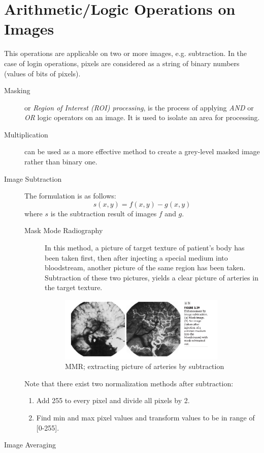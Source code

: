\documentclass{article}
\begin{document}
\section{Arithmetic/Logic Operations on Images}
This operations are applicable on two or more images, e.g. subtraction. In the case of login operations, pixels are considered as a string of binary numbers (values of bits of pixels).\\
\begin{description}
\item[Masking] or \textit{Region of Interest (ROI) processing}, is the process of applying \textit{AND} or \textit{OR} logic operators on an image. It is used to isolate an area for processing.\\
\item[Multiplication] can be used as a more effective method to create a grey-level masked image rather than binary one.
\item[Image Subtraction] 
	The formulation is as follows:
	\begin{equation}
		s(x, y) = f(x, y) - g(x, y)
	\end{equation}
	where $s$ is the subtraction result of images $f$ and $g$.
\begin{description}
	\item[Mask Mode Radiography] In this method, a picture of target texture of patient's body has been taken first, then after injecting a special medium into bloodstream, another picture of the same region has been taken. Subtraction of these two pictures, yields a clear picture of arteries in the target texture. 
	\begin{figure}[h]
	\centering
	\includegraphics[width=300px]{./Imgs/mmr.png}
	\caption{MMR; extracting picture of arteries by subtraction}
	\end{figure}
\end{description} 
Note that there exist two normalization methods after subtraction:\\
\begin{enumerate}
	\item Add 255 to every pixel and divide all pixels by 2.
	\item Find min and max pixel values and transform values to be in range of [0-255].
\end{enumerate}

\item[Image Averaging]

\end{description}
\end{document}
